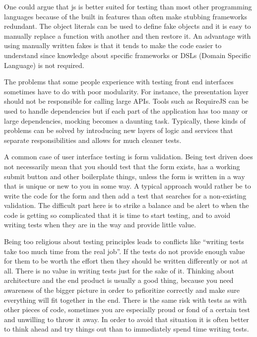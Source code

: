 \documentclass[11pt]{article}
\begin{document}

One could argue that \gls{js} is better suited for testing than most other programming languages because of the built in features than often make stubbing frameworks redundant. The object literals can be used to define fake objects and it is easy to manually replace a function with another and then restore it. An advantage with using manually written fakes is that it tends to make the code easier to understand since knowledge about specific frameworks or DSLs (Domain Specific Language) is not required. \cite[questions~20-21]{Edelstam}\label{LiteralFakes}

The problems that some people experience with testing front end interfaces sometimes have to do with poor modularity. For instance, the presentation layer should not be responsible for calling large APIs. Tools such as RequireJS can be used to handle dependencies but if each part of the application has too many or large dependencies, mocking becomes a daunting task. Typically, these kinds of problems can be solved by introducing new layers of logic and services that separate responsibilities and allows for much cleaner tests. \cite[question~23]{Edelstam}

A common case of user interface testing is form validation. Being test driven does not necessarily mean that you should test that the form exists, has a working submit button and other boilerplate things, unless the form is written in a way that is unique or new to you in some way. A typical approach would rather be to write the code for the form and then add a test that searches for a non-existing validation. The difficult part here is to strike a balance and be alert to when the code is getting so complicated that it is time to start testing, and to avoid writing tests when they are in the way and provide little value. \cite[questions~24-25]{Edelstam}

Being too religious about testing principles leads to conflicts like ``writing tests take too much time from the real job''. If the tests do not provide enough value for them to be worth the effort then they should be written differently or not at all. There is no value in writing tests just for the sake of it. Thinking about architecture and the end product is usually a good thing, because you need awareness of the bigger picture in order to prfioritize correctly and make sure everything will fit together in the end. There is the same risk with tests as with other pieces of code, sometimes you are especially proud or fond of a certain test and unwilling to throw it away. In order to avoid that situation it is often better to think ahead and try things out than to immediately spend time writing tests. \cite[question~27]{Edelstam}
\end{document}

